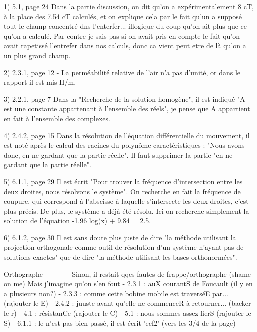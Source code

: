 
1) 5.1, page 24
Dans la partie discussion, on dit qu'on a expérimentalement 8 cT, à la place des 7.54 cT calculés, et on explique 
cela par le fait qu'un a supposé tout le champ concentré dns l'enterfer... illogique du coup qu'on ait plus que ce qu'on a calculé.
Par contre je sais pas si on avait pris en compte le fait qu'on avait rapetissé l'entrefer dans nos calculs, donc ca vient peut
etre de là qu'on a un plus grand champ.

2) 2.3.1, page 12
- La perméabilité relative de l'air n'a pas d'unité, or dans le rapport il est mis H/m.

3) 2.2.1, page 7
Dans la "Recherche de la solution homogène", il est indiqué "A est une constante appartenant
à l'ensemble des réels", je pense que A appartient en fait à l'ensemble des complexes.

4) 2.4.2, page 15
Dans la résolution de l'équation différentielle du mouvement, il est noté après le calcul
des racines du polynôme caractéristiques : "Nous avons donc, en ne gardant que la partie réelle".
Il faut supprimer la partie "en ne gardant que la partie réelle".

5) 6.1.1, page 29
Il est écrit "Pour trouver la fréquence d'intersection entre les deux droites, nous résolvons le système".
On recherche en fait la fréquence de coupure, qui correspond à l'abscisse à laquelle s'intersecte les
deux droites, c'est plus précis. De plus, le système a déjà été résolu. Ici on recherche simplement la
solution de l'équation -1.96 log(x) + 9.84 = 2.5.

6) 6.1.2, page 30
Il est sans doute plus juste de dire "la méthode utilisant la projection orthogonale comme outil
de résolution d'un système n'ayant pas de solutions exactes" que de dire "la méthode utilisant les
bases orthonormées".

Orthographe
-----------
Sinon, il restait qqes fautes de frappe/orthographe (shame on me) Mais j'imagine qu'on s'en fout
- 2.3.1 : auX courantS de Foucault (il y en a plusieurs non?)
- 2.3.3 : comme cette bobine mobile est traverséE par... (rajouter le E)
- 2.4.2 : juuste avant qu'elle ne commenceR à retourner... (backer le r)
- 4.1 : résistanCe (rajouter le C)
- 5.1 : nous sommes assez fierS (rajouter le S)
- 6.1.1 : le \vec n'est pas bien passé, il est écrit 'ecf2' (vers les 3/4 de la page)
